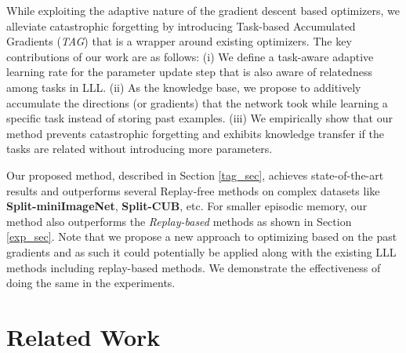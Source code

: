 \documentclass{article} \usepackage{collas2022_conference,times}
\begin{document}
    While exploiting the adaptive nature of the gradient descent based optimizers, we alleviate catastrophic forgetting by introducing Task-based Accumulated Gradients (\textit{TAG}) that is a wrapper around existing optimizers. The key contributions of our work are as follows: (i)
We define a task-aware adaptive learning rate for the parameter update step that is also aware of relatedness among tasks in LLL. 
(ii) As the knowledge base, we propose to additively accumulate the directions (or gradients) that the network took while learning a specific task instead of storing past examples.
(iii) We empirically show that our method prevents catastrophic forgetting and exhibits knowledge transfer if the tasks are related without introducing more parameters.


    Our proposed method, described in Section \ref{tag_sec}, achieves state-of-the-art results and outperforms several Replay-free methods on complex datasets like \textbf{Split-miniImageNet}, \textbf{Split-CUB}, etc. For smaller episodic memory, our method also outperforms the \textit{Replay-based} methods as shown in Section \ref{exp_sec}. Note that we propose a new approach to optimizing based on the past gradients and as such it could potentially be applied along with the existing LLL methods including replay-based methods. We demonstrate the effectiveness of doing the same in the experiments. 
    
\section{Related Work}
\end{document}

